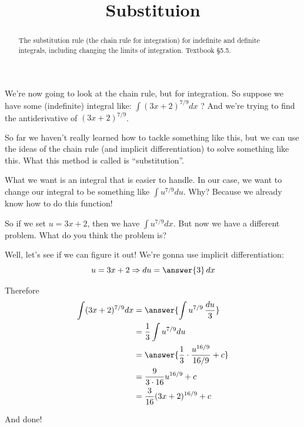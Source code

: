 \documentclass{ximera}
\title{Substituion}
\begin{document}
\begin{abstract}
The substitution rule (the chain rule for integration) for indefinite and definite integrals, including changing the limits of integration. Textbook §5.5.
\end{abstract}
\maketitle

We're now going to look at the chain rule, but for integration. So suppose we have some (indefinite) integral like: $\int(3 x+2)^{7 / 9} d x$ ? And we're trying to find the antiderivative of $(3 x+2)^{7 / 9}$.

So far we haven't really learned how to tackle something like this, but we can use the ideas of the chain rule (and implicit differentiation) to solve something like this. What this method is called is ``substitution''.

What we want is an integral that is easier to handle. In our case, we want to change our integral to be something like $\int u^{7 / 9} d u$. Why? Because we already know how to do this function!

So if we set $u=3 x+2$, then we have $\int u^{7 / 9} d x$. But now we have a different problem. What do you think the problem is?
\begin{freeResponse}\end{freeResponse}

Well, let's see if we can figure it out! We're gonna use implicit differentiation:
\[
u=3 x+2 \Rightarrow d u=\answer{3}\, d x
\]

Therefore
\[
\begin{aligned}
\int(3 x+2)^{7 / 9} d x & =\answer{\int u^{7 / 9}\, \frac{d u}{3}} \\
& =\frac{1}{3} \int u^{7 / 9} d u \\
& =\answer{\frac{1}{3} \cdot \frac{u^{16 / 9}}{16 / 9}+c} \\
& =\frac{9}{3 \cdot 16} u^{16 / 9}+c \\
& =\frac{3}{16}(3 x+2)^{16 / 9}+c
\end{aligned}
\]

And done!
\end{document}
